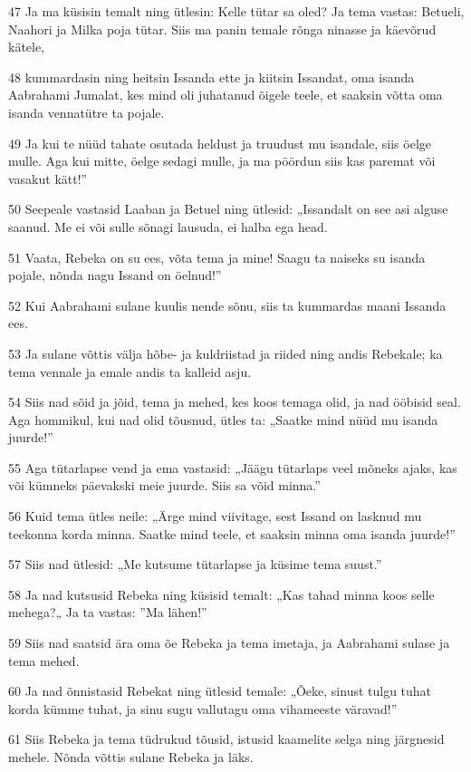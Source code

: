 \par 47 Ja ma küsisin temalt ning ütlesin: Kelle tütar sa oled? Ja tema vastas: Betueli, Naahori ja Milka poja tütar. Siis ma panin temale rõnga ninasse ja käevõrud kätele,
\par 48 kummardasin ning heitsin Issanda ette ja kiitsin Issandat, oma isanda Aabrahami Jumalat, kes mind oli juhatanud õigele teele, et saaksin võtta oma isanda vennatütre ta pojale.
\par 49 Ja kui te nüüd tahate osutada heldust ja truudust mu isandale, siis öelge mulle. Aga kui mitte, öelge sedagi mulle, ja ma pöördun siis kas paremat või vasakut kätt!”
\par 50 Seepeale vastasid Laaban ja Betuel ning ütlesid: „Issandalt on see asi alguse saanud. Me ei või sulle sõnagi lausuda, ei halba ega head.
\par 51 Vaata, Rebeka on su ees, võta tema ja mine! Saagu ta naiseks su isanda pojale, nõnda nagu Issand on öelnud!”
\par 52 Kui Aabrahami sulane kuulis nende sõnu, siis ta kummardas maani Issanda ees.
\par 53 Ja sulane võttis välja hõbe- ja kuldriistad ja riided ning andis Rebekale; ka tema vennale ja emale andis ta kalleid asju.
\par 54 Siis nad sõid ja jõid, tema ja mehed, kes koos temaga olid, ja nad ööbisid seal. Aga hommikul, kui nad olid tõusnud, ütles ta: „Saatke mind nüüd mu isanda juurde!”
\par 55 Aga tütarlapse vend ja ema vastasid: „Jäägu tütarlaps veel mõneks ajaks, kas või kümneks päevakski meie juurde. Siis sa võid minna.”
\par 56 Kuid tema ütles neile: „Ärge mind viivitage, sest Issand on lasknud mu teekonna korda minna. Saatke mind teele, et saaksin minna oma isanda juurde!”
\par 57 Siis nad ütlesid: „Me kutsume tütarlapse ja küsime tema suust.”
\par 58 Ja nad kutsusid Rebeka ning küsisid temalt: „Kas tahad minna koos selle mehega?„ Ja ta vastas: ”Ma lähen!”
\par 59 Siis nad saatsid ära oma õe Rebeka ja tema imetaja, ja Aabrahami sulase ja tema mehed.
\par 60 Ja nad õnnistasid Rebekat ning ütlesid temale: „Õeke, sinust tulgu tuhat korda kümme tuhat, ja sinu sugu vallutagu oma vihameeste väravad!”
\par 61 Siis Rebeka ja tema tüdrukud tõusid, istusid kaamelite selga ning järgnesid mehele. Nõnda võttis sulane Rebeka ja läks.
